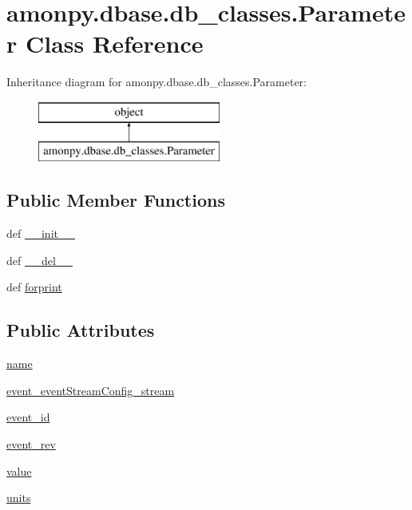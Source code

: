 \hypertarget{classamonpy_1_1dbase_1_1db__classes_1_1_parameter}{\section{amonpy.\-dbase.\-db\-\_\-classes.\-Parameter Class Reference}
\label{classamonpy_1_1dbase_1_1db__classes_1_1_parameter}
}
Inheritance diagram for amonpy.\-dbase.\-db\-\_\-classes.\-Parameter\-:\begin{figure}[H]
\begin{center}
\leavevmode
\includegraphics[height=2.000000cm]{classamonpy_1_1dbase_1_1db__classes_1_1_parameter}
\end{center}
\end{figure}
\subsection*{Public Member Functions}
\begin{DoxyCompactItemize}
\item 
def \hyperlink{classamonpy_1_1dbase_1_1db__classes_1_1_parameter_abc3913dc5879e008adb7de677cf34b8e}{\-\_\-\-\_\-init\-\_\-\-\_\-}
\item 
def \hyperlink{classamonpy_1_1dbase_1_1db__classes_1_1_parameter_abac2de24228484435501c9c463761b87}{\-\_\-\-\_\-del\-\_\-\-\_\-}
\item 
def \hyperlink{classamonpy_1_1dbase_1_1db__classes_1_1_parameter_ae24e3a156b51cb1885f55962943dcdef}{forprint}
\end{DoxyCompactItemize}
\subsection*{Public Attributes}
\begin{DoxyCompactItemize}
\item 
\hyperlink{classamonpy_1_1dbase_1_1db__classes_1_1_parameter_a0578aa061ddcf50100cdcbb3851b4c8d}{name}
\item 
\hyperlink{classamonpy_1_1dbase_1_1db__classes_1_1_parameter_af157b9f3c2405f093d65190a6c078bdb}{event\-\_\-event\-Stream\-Config\-\_\-stream}
\item 
\hyperlink{classamonpy_1_1dbase_1_1db__classes_1_1_parameter_abe0eddf1963377c0d06d38e712fe6753}{event\-\_\-id}
\item 
\hyperlink{classamonpy_1_1dbase_1_1db__classes_1_1_parameter_a6908790136a283636be265dcca358567}{event\-\_\-rev}
\item 
\hyperlink{classamonpy_1_1dbase_1_1db__classes_1_1_parameter_ac077e0db5b88e49166cd5066a1ffafe7}{value}
\item 
\hyperlink{classamonpy_1_1dbase_1_1db__classes_1_1_parameter_aafe3f971978610b9e6a29a9853c71c61}{units}
\end{DoxyCompactItemize}
